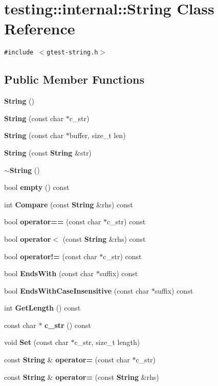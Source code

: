 \section{testing::internal::String Class Reference}
\label{classtesting_1_1internal_1_1String}
{\tt \#include $<$gtest-string.h$>$}

\subsection*{Public Member Functions}
\begin{CompactItemize}
\item 
{\bf String} ()
\item 
{\bf String} (const char $\ast$c\_\-str)
\item 
{\bf String} (const char $\ast$buffer, size\_\-t len)
\item 
{\bf String} (const {\bf String} \&str)
\item 
{\bf $\sim$String} ()
\item 
bool {\bf empty} () const
\item 
int {\bf Compare} (const {\bf String} \&rhs) const 
\item 
bool {\bf operator==} (const char $\ast$c\_\-str) const 
\item 
bool {\bf operator$<$} (const {\bf String} \&rhs) const 
\item 
bool {\bf operator!=} (const char $\ast$c\_\-str) const 
\item 
bool {\bf EndsWith} (const char $\ast$suffix) const
\item 
bool {\bf EndsWithCaseInsensitive} (const char $\ast$suffix) const
\item 
int {\bf GetLength} () const
\item 
const char $\ast$ {\bf c\_\-str} () const
\item 
void {\bf Set} (const char $\ast$c\_\-str, size\_\-t length)
\item 
const {\bf String} \& {\bf operator=} (const char $\ast$c\_\-str)
\item 
const {\bf String} \& {\bf operator=} (const {\bf String} \&rhs)
\end{CompactItemize}
